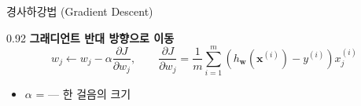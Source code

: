 \begin{frame}{경사하강법 (Gradient Descent)}
\begin{center}\begin{varwidth}{0.92\textwidth}
  \textbf{그래디언트 반대 방향으로 이동}
  \[
  w_j \leftarrow w_j - \alpha \frac{\partial J}{\partial w_j}, \hspace{2em}
  \frac{\partial J}{\partial w_j} = \frac{1}{m}\sum_{i=1}^m
  \left(h_{\boldsymbol{w}}(\boldsymbol{x}^{(i)}) - y^{(i)}\right) x_j^{(i)}
  \]
  \begin{itemize}
    \item $\alpha$ =  --- 한 걸음의 크기
    
  \end{itemize}
\end{varwidth}\end{center}
\end{frame}
